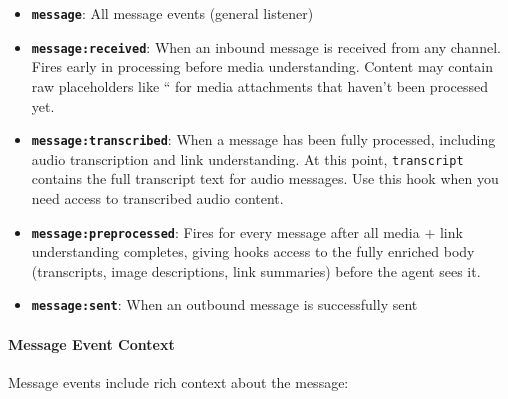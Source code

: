 \begin{itemize}
  \item \textbf{\texttt{message}}: All message events (general listener)
  \item \textbf{\texttt{message:received}}: When an inbound message is received from any channel. Fires early in processing before media understanding. Content may contain raw placeholders like `` for media attachments that haven't been processed yet.
  \item \textbf{\texttt{message:transcribed}}: When a message has been fully processed, including audio transcription and link understanding. At this point, \texttt{transcript} contains the full transcript text for audio messages. Use this hook when you need access to transcribed audio content.
  \item \textbf{\texttt{message:preprocessed}}: Fires for every message after all media + link understanding completes, giving hooks access to the fully enriched body (transcripts, image descriptions, link summaries) before the agent sees it.
  \item \textbf{\texttt{message:sent}}: When an outbound message is successfully sent
\end{itemize}


\paragraph{Message Event Context}


Message events include rich context about the message:

